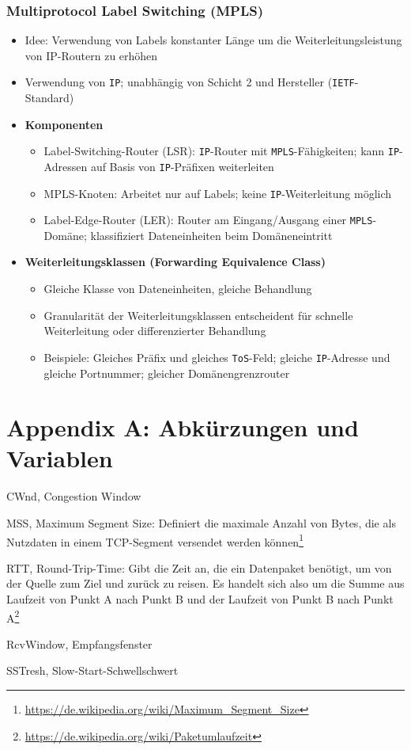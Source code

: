 \subsubsection{Multiprotocol Label Switching (MPLS)}
\begin{itemize}
	\item Idee: Verwendung von Labels konstanter Länge um die Weiterleitungsleistung von IP-Routern zu erhöhen
	\item Verwendung von \texttt{IP}; unabhängig von Schicht 2 und Hersteller (\texttt{IETF}-Standard)
	\item \textbf{Komponenten}
	\begin{itemize}
		\item Label-Switching-Router (LSR): \texttt{IP}-Router mit \texttt{MPLS}-Fähigkeiten; kann \texttt{IP}-Adressen auf Basis von \texttt{IP}-Präfixen weiterleiten
		\item MPLS-Knoten: Arbeitet nur auf Labels; keine \texttt{IP}-Weiterleitung möglich
		\item Label-Edge-Router (LER): Router am Eingang/Ausgang einer \texttt{MPLS}-Domäne; klassifiziert Dateneinheiten beim Domäneneintritt
	\end{itemize}
	\item \textbf{Weiterleitungsklassen (Forwarding Equivalence Class)}
	\begin{itemize}
		\item Gleiche Klasse von Dateneinheiten, gleiche Behandlung
		\item Granularität der Weiterleitungsklassen entscheident für schnelle Weiterleitung oder differenzierter Behandlung
		\item Beispiele: Gleiches Präfix und gleiches \texttt{ToS}-Feld; gleiche \texttt{IP}-Adresse und gleiche Portnummer; gleicher Domänengrenzrouter
	\end{itemize}
\end{itemize}



\section{Appendix A: Abkürzungen und Variablen}
\begin{description}
	\item{CWnd, Congestion Window}
	\item{MSS, Maximum Segment Size}: Definiert die maximale Anzahl von Bytes, die als Nutzdaten in einem TCP-Segment versendet werden können\footnote{\url{https://de.wikipedia.org/wiki/Maximum\_Segment\_Size}}
	\item{RTT, Round-Trip-Time}: Gibt die Zeit an, die ein Datenpaket benötigt, um von der Quelle zum Ziel und zurück zu reisen. Es handelt sich also um die Summe aus Laufzeit von Punkt A nach Punkt B und der Laufzeit von Punkt B nach Punkt A\footnote{\url{https://de.wikipedia.org/wiki/Paketumlaufzeit}}
	\item{RcvWindow, Empfangsfenster}
	\item{SSTresh, Slow-Start-Schwellschwert}
\end{description}